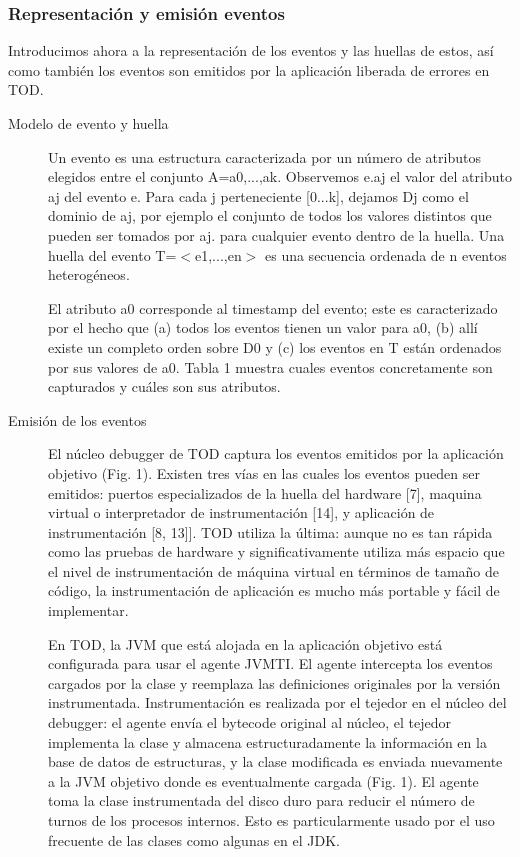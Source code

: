 \documentclass[12pt,a4paper]{report}
\begin{document}
			\subsubsection{Representación y emisión eventos}

Introducimos ahora a la representación de los eventos y las huellas de estos, así como también los eventos son emitidos por la aplicación liberada de errores en TOD.

\begin{description}

	\item[Modelo de evento y huella] Un evento es una estructura caracterizada por un número de atributos elegidos entre el conjunto A={a0,...,ak}.   Observemos e.aj el valor del atributo aj del evento e.  Para cada j perteneciente [0...k], dejamos Dj como el dominio de aj, por ejemplo el conjunto de todos los valores distintos que pueden ser tomados por aj. para cualquier evento dentro de la huella.  Una huella del evento T=$<$e1,...,en$>$ es una secuencia ordenada de n eventos heterogéneos.

El atributo a0 corresponde al timestamp del evento; este es caracterizado por el hecho que (a) todos los eventos tienen un valor para a0, (b) allí existe un completo orden sobre D0 y (c) los eventos en T están ordenados por sus valores de a0.  Tabla 1 muestra cuales eventos concretamente son capturados y cuáles son sus atributos.

	\item[Emisión de los eventos]  El núcleo debugger de TOD captura los eventos emitidos por la aplicación objetivo (Fig. 1).  Existen tres vías en las cuales los eventos pueden ser emitidos:  puertos especializados de la huella del hardware [7],  maquina virtual o interpretador de instrumentación [14], y aplicación de instrumentación [8, 13]].  TOD utiliza la última:  aunque no es tan rápida como las pruebas de hardware y significativamente utiliza más espacio que el nivel de instrumentación de máquina virtual en términos de tamaño de código, la instrumentación de aplicación es mucho más portable y fácil de implementar.

En TOD, la JVM que está alojada en la aplicación objetivo está configurada para usar el agente  JVMTI\footnotemark[1] .  El agente intercepta los eventos cargados por la clase y reemplaza las definiciones originales por la versión instrumentada.  Instrumentación es realizada por el tejedor en el núcleo del debugger:  el agente envía el bytecode original al núcleo,  el tejedor implementa la clase y almacena estructuradamente la información en la base de datos de estructuras, y la clase modificada es enviada nuevamente a la JVM objetivo donde es eventualmente cargada (Fig. 1).  El agente toma la clase instrumentada del disco duro para reducir el número de turnos de los procesos internos.  Esto es  particularmente usado por el uso frecuente de las clases como algunas en el JDK.


\end{description}
\end{document}
